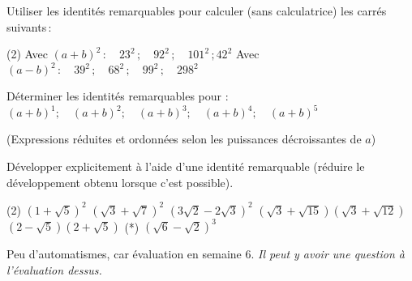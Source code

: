 \documentclass[a4paper,12pt]{report}
\begin{document}
\begin{exo}
	Utiliser les identités remarquables pour calculer (sans calculatrice) les carrés suivants\,:
	\begin{tasks}(2)
\task Avec $(a+b)^2\,: \quad  23^2\,;\quad  92^2\,;\quad 101^2\,; 42^2$
\task Avec $(a-b)^2\,:\quad 39^2\,;\quad 68^2\,;\quad 99^2\,;\quad 298^2$
	\end{tasks}
\end{exo}
\begin{exo}
Déterminer les identités remarquables pour : $(a+b)^1 ; \quad(a+b)^2 ; \quad(a+b)^3 ; \quad(a+b)^4 ; \quad(a+b)^5$ 

(Expressions réduites et ordonnées selon les puissances décroissantes de $a$)
\end{exo}
\begin{exo}
Développer explicitement à l'aide d'une identité remarquable
(réduire le développement obtenu lorsque c'est possible).
	\begin{tasks}(2)
\task $(1+\sqrt{5})^2$
\task $(\sqrt{3}+\sqrt{7})^2$
\task $(3 \sqrt{2}-2 \sqrt{3})^2$
\task $(\sqrt{3}+\sqrt{15})(\sqrt{3}+\sqrt{12})$
\task $(2-\sqrt{5})(2+\sqrt{5})$
\task (*) $(\sqrt{6}-\sqrt{2})^3$
	\end{tasks}
\end{exo}


Peu d'automatismes, car évaluation en semaine 6. \emph{Il peut y avoir une question à l'évaluation dessus.}
\end{document}
